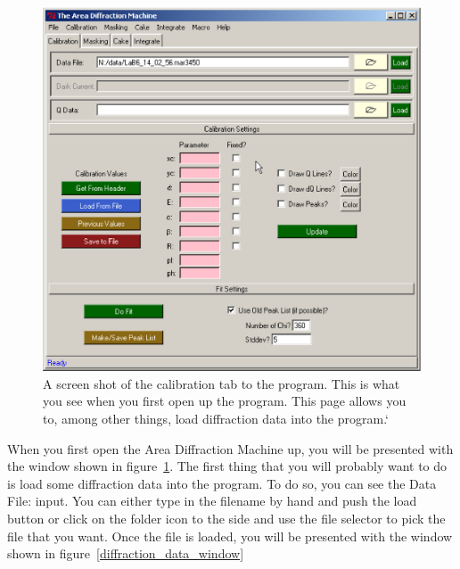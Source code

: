 
\begin{figure}
    \centering
    \includegraphics[scale=.75]{figures/calibration_page.eps}
    \caption{A screen shot of the calibration tab to the program.
    This is what you see when you first open up the program. 
    This page allows you to, among other things, load diffraction
    data into the program.`} 
    \label{calibration_page}
\end{figure}

When you first open the Area Diffraction Machine up, you
will be presented with the window shown in 
figure~\ref{calibration_page}. The first thing that you
will probably want to do is load some diffraction data into
the program. To do so, you can see the Data File: input.
You can either type in the filename by hand and push the
load button or click on the folder icon to the side and
use the file selector to pick the file that you want.
Once the file is loaded, you will be presented with
the window shown in figure~\ref{diffraction_data_window}

